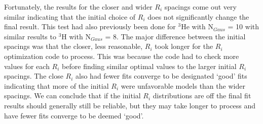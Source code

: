 Fortunately, the results for the closer and wider $R_i$ spacings come out very similar indicating that the initial choice of $R_i$ does not significantly change the final result. This test had also previously been done for $^3$He with N$_{Gaus}$ = 10 with similar results to $^3$H with N$_{Gaus}$ = 8. The major difference between the initial spacings was that the closer, less reasonable, $R_i$ took longer for the $R_i$ optimization code to process. This was because the code had to check more values for each $R_i$ before finding similar optimal values to the larger initial $R_i$ spacings. The close $R_i$ also had fewer fits converge to be designated `good' fits indicating that more of the initial $R_i$ were unfavorable models than the wider spacings. We can conclude that if the initial $R_i$ distributions are off the final fit results should generally still be reliable, but they may take longer to process and have fewer fits converge to be deemed `good'.  


